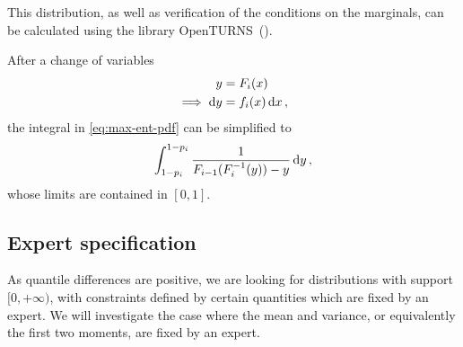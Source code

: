 \documentclass{article}
\newcommand{\dd}{{\rm d}}
\begin{document}
This distribution, as well as verification
of the conditions on the marginals,
can be calculated using the library OpenTURNS~(\cite{OpenTURNS}).
%

%
After a change of variables
%
\begin{align*}
	y &= F_i(x) \\
	\implies \dd y &= f_i(x) \, \dd x \,,
\end{align*}
%
the integral in \ref{eq:max-ent-pdf} can be simplified to
%
\begin{align*}
	\int_{1 - p_i}^{1 - p_i} \frac{1}{F_{i - 1}(F^{-1}_i(y)) - y}
		\, \dd y \,,
\end{align*}
%
whose limits are contained in $[0, 1]$.
\subsection{Expert specification}
%
As quantile differences are positive,
we are looking for distributions with support $[0, +\infty)$,
with constraints defined by certain quantities which are fixed by an expert.
We will investigate the case where the mean and variance,
or equivalently the first two moments, are fixed by an expert.
%
\end{document}
